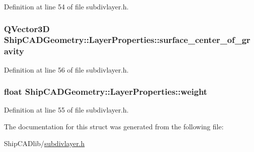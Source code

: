 Definition at line 54 of file subdivlayer.\-h.

\hypertarget{structShipCADGeometry_1_1LayerProperties_aa30ff3a9afe247ba04327d79f4f398c4}{
\subsubsection[{surface\-\_\-center\-\_\-of\-\_\-gravity}]{\setlength{\rightskip}{0pt plus 5cm}Q\-Vector3\-D Ship\-C\-A\-D\-Geometry\-::\-Layer\-Properties\-::surface\-\_\-center\-\_\-of\-\_\-gravity}}\label{structShipCADGeometry_1_1LayerProperties_aa30ff3a9afe247ba04327d79f4f398c4}


Definition at line 56 of file subdivlayer.\-h.

\hypertarget{structShipCADGeometry_1_1LayerProperties_a6905a3f5c097cc4f251455a6267c9db9}{
\subsubsection[{weight}]{\setlength{\rightskip}{0pt plus 5cm}float Ship\-C\-A\-D\-Geometry\-::\-Layer\-Properties\-::weight}}\label{structShipCADGeometry_1_1LayerProperties_a6905a3f5c097cc4f251455a6267c9db9}


Definition at line 55 of file subdivlayer.\-h.



The documentation for this struct was generated from the following file\-:\begin{DoxyCompactItemize}
\item 
Ship\-C\-A\-Dlib/\hyperlink{subdivlayer_8h}{subdivlayer.\-h}\end{DoxyCompactItemize}

